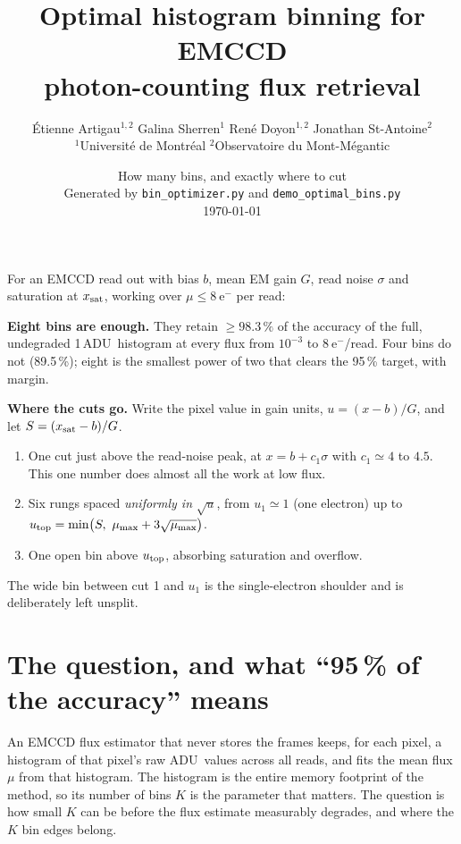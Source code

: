 \documentclass[11pt,a4paper]{article}
\title{\vspace{-1.5cm}\textbf{Optimal histogram binning for EMCCD\\photon-counting flux retrieval}}
\author{\normalsize \'Etienne Artigau$^{1,2}$ \quad Galina Sherren$^{1}$ \quad
Ren\'e Doyon$^{1,2}$ \quad Jonathan St-Antoine$^{2}$\\[3pt]
\footnotesize $^{1}$Universit\'e de Montr\'eal \qquad
$^{2}$Observatoire du Mont-M\'egantic}
\date{\normalsize How many bins, and exactly where to cut\\[2pt]
\normalsize Generated by \texttt{bin\_optimizer.py} and \texttt{demo\_optimal\_bins.py}\\
\normalsize \today}
\newcommand{\ADU}{\ensuremath{\mathrm{ADU}}}
\newcommand{\eminus}{\ensuremath{\mathrm{e}^-}}
\begin{document}
\maketitle
\vspace{-0.8cm}

\begin{tcolorbox}[colback=soft,colframe=accent,title=\textbf{Answer in one box}]
For an EMCCD read out with bias $b$, mean EM gain $G$, read noise $\sigma$ and
saturation at $x_{\rm sat}$, working over $\mu \le 8\ \eminus$ per read:

\medskip
\textbf{Eight bins are enough.} They retain $\ge 98.3\,\%$ of the accuracy of
the full, undegraded 1\,\ADU\ histogram at every flux from $10^{-3}$ to
$8\ \eminus$/read. Four bins do not (89.5\,\%); eight is the smallest power of
two that clears the 95\,\% target, with margin.

\medskip
\textbf{Where the cuts go.} Write the pixel value in gain units,
$u = (x-b)/G$, and let $S = (x_{\rm sat}-b)/G$.

\begin{enumerate}\itemsep2pt
\item One cut just above the read-noise peak, at $x = b + c_1\sigma$ with
      $c_1 \simeq 4$ to $4.5$. This one number does almost all the work at low
      flux.
\item Six rungs spaced \emph{uniformly in} $\sqrt{u}$, from $u_1 \simeq 1$
      (one electron) up to
      $u_{\rm top} = \min\!\big(S,\ \mu_{\max} + 3\sqrt{\mu_{\max}}\big)$.
\item One open bin above $u_{\rm top}$, absorbing saturation and overflow.
\end{enumerate}

\medskip
The wide bin between cut 1 and $u_1$ is the single-electron shoulder and is
deliberately left unsplit.
\end{tcolorbox}

\section{The question, and what ``95\,\% of the accuracy'' means}

An EMCCD flux estimator that never stores the frames keeps, for each pixel, a
histogram of that pixel's raw \ADU\ values across all reads, and fits the mean
flux $\mu$ from that histogram. The histogram is the entire memory footprint of
the method, so its number of bins $K$ is the parameter that matters. The
question is how small $K$ can be before the flux estimate measurably degrades,
and where the $K$ bin edges belong.
\end{document}
